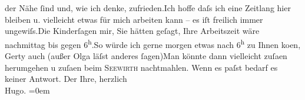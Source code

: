 \begin{ledgroupsized}[t]{13cm}
               der Nähe ſind und, wie ich denke, zufrieden.\hspace*{1.5em}Ich
               hoffe daſs ich eine Zeitlang hier bleiben u. vielleicht etwas für mich arbeiten kann
               – es iſt freilich immer ungewiſs.\hspace*{1.5em}Die Kinderſagen mir, Sie hätten {\pb}geſagt, Ihre Arbeitszeit wäre
               nachmittag bis gegen 6\textsuperscript{h}.\hspace*{1.5em}So würde ich gerne morgen etwas nach 6\textsuperscript{h} zu Ihnen ko{\geminationm}en, Gerty auch (außer Olga läſst anderes
                  ſagen)\hspace*{1.5em}Man könnte dann vielleicht zuſa{\geminationm}en herumgehen u zuſa{\geminationm}en
               beim \textsc{Seewirth} nachtmahlen. Wenn es paſst bedarf es keiner Antwort.\pend
           \pstart
           Der Ihre, herzlich{\\[\baselineskip]}\spacefill\mbox{Hugo.}\pend
           \leftskip=0em{}
         
         \endnumbering{}\end{ledgroupsized}  \newcommand{\dateiname}{L02234}\newcommand{\titel}{Hugo von Hofmannsthal an Arthur Schnitzler, 24. 7. [1916]}\newcommand{\editorInnen}{Martin Anton Müller und Gerd-Hermann Susen}
      